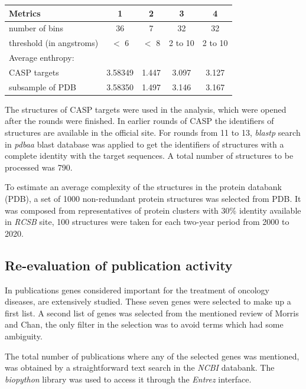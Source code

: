 \documentclass[12pt,aps]{revtex4}
\begin{document}
\begin{center} 
\begin{tabular} {|l|cccc|}
\hline
\textbf{Metrics} & 1 & 2 & 3 & 4 \\
\hline
number of bins & 36 & 7 & 32 & 32 \\
threshold (in angstroms) & $<$ 6 &  $<$ 8 & 2 to 10 & 2 to 10 \\
\hline
Average enthropy: & & & & \\
CASP targets & 3.58349 & 1.447 & 3.097 & 3.127 \\
subsample of PDB & 3.58350 & 1.497 & 3.146 & 3.167 \\
\hline
\end{tabular}
\end{center}

The structures of CASP targets were used in the analysis, which were opened after the rounds were finished. In earlier rounds of CASP the identifiers of structures are available in the official site. For rounds from 11 to 13, \textit{blastp} search in \textit{pdbaa} blast database was applied to get the identifiers of structures with a complete identity with the target sequences. A total number of structures to be processed was 790.

To estimate an average complexity of the structures in the protein databank (PDB), a set of 1000 non-redundant protein structures was selected from PDB. It was composed from representatives of protein clusters with 30\% identity available in \textit{RCSB} site, 100 structures were taken for each two-year period from 2000 to 2020.

\subsection{Re-evaluation of publication activity}

In publications \cite{CM1,CM2,CM3,CM4,CM5,CM6,CM7} genes considered important for the treatment of oncology diseases, are extensively studied. These seven genes were selected to make up a first list. A second list of genes was selected from the mentioned review of Morris and Chan, the only filter in the selection was to avoid terms which had some ambiguity.

The total number of publications where any of the selected genes was mentioned, was obtained by a straightforward text search in the \textit{NCBI} databank. The \textit{biopython} library was used to access it through the \textit{Entrez} interface.
\end{document}
